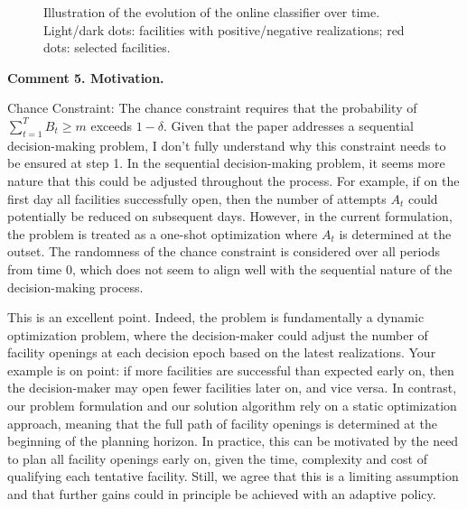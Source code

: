 \documentclass[11pt]{article}
\begin{document}
\begin{figure}[h!]
{
    }
	\caption{Illustration of the evolution of the online classifier over time. Light/dark dots: facilities with positive/negative realizations; red dots: selected facilities.}
    \label{fig:error_R2}
\end{figure}


\begin{commentBox}
    \textbf{Comment 5. Motivation.}\label{R2:5}

    Chance Constraint: The chance constraint requires that the probability of $\sum_{t=1}^T B_t \geq m$ exceeds $1-\delta$. Given that the paper addresses a sequential decision-making problem, I don’t fully understand why this constraint needs to be ensured at step 1. In the sequential decision-making problem, it seems more nature that this could be adjusted throughout the process. For example, if on the first day all facilities successfully open, then the number of attempts $A_t$ could potentially be reduced on subsequent days. However, in the current formulation, the problem is treated as a one-shot optimization where $A_t$ is determined at the outset. The randomness of the chance constraint is considered over all periods from time 0, which does not seem to align well with the sequential nature of the decision-making process.
\end{commentBox}

This is an excellent point. Indeed, the problem is fundamentally a dynamic optimization problem, where the decision-maker could adjust the number of facility openings at each decision epoch based on the latest realizations. Your example is on point: if more facilities are successful than expected early on, then the decision-maker may open fewer facilities later on, and vice versa. In contrast, our problem formulation and our solution algorithm rely on a static optimization approach, meaning that the full path of facility openings is determined at the beginning of the planning horizon. In practice, this can be motivated by the need to plan all facility openings early on, given the time, complexity and cost of qualifying each tentative facility. Still, we agree that this is a limiting assumption and that further gains could in principle be achieved with an adaptive policy.
\end{document}

